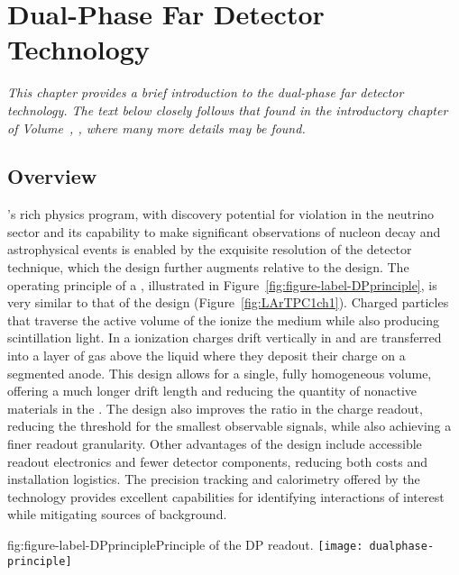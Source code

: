 \chapter{Dual-Phase Far Detector Technology}
\label{ch:exec-dp}

\textit{This chapter provides a brief introduction to the dual-phase far detector technology.  The text below closely follows that found in the introductory chapter of Volume~\volnumberdp{}, \voltitledp{}, where many more details may be found.}


\section{Overview}
\label{sec:dp-execsum-introduction}


's rich physics program, with discovery potential for  violation in the neutrino sector and its capability to make significant observations of nucleon decay and astrophysical events is enabled by the exquisite resolution of the  detector technique, which the  design further augments relative to the  design. 
The operating principle of a  , illustrated in Figure~\ref{fig:figure-label-DPprinciple}, is very similar to that of the  design (Figure~\ref{fig:LArTPC1ch1}).  Charged particles that traverse the active volume of the  ionize the medium while also producing scintillation light. 
In a  ionization charges drift vertically in  and are transferred
into a layer of gas above the liquid where they deposit their charge on a segmented anode. This design allows for a single, fully homogeneous  volume, offering a much longer drift length and reducing  the quantity of nonactive materials in the .
The design also improves the  ratio in the charge readout, reducing the threshold for the smallest observable signals, while also achieving a finer readout granularity.  
Other advantages of the  design include accessible readout electronics and fewer detector components, reducing both costs and installation logistics.
The precision tracking and calorimetry offered by the  technology provides excellent capabilities for identifying interactions of interest while mitigating sources of background.  

\begin{dunefigure}{fig:figure-label-DPprinciple}{Principle of the DP readout.}
\texttt{[image: dualphase-principle]}
\end{dunefigure}


